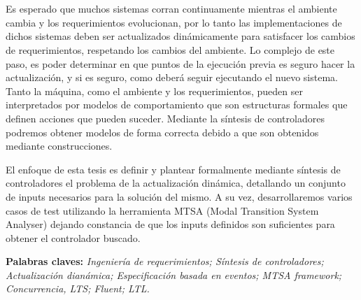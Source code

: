 \chapter*{\runtitulo}

\noindent Es esperado que muchos sistemas corran continuamente mientras el ambiente cambia y los
requerimientos evolucionan, por lo tanto las implementaciones de dichos sistemas deben ser
actualizados dinámicamente para satisfacer los cambios de requerimientos, respetando los cambios
del ambiente. Lo complejo de este paso, es poder determinar en que puntos de la ejecución previa
es seguro hacer la actualización, y si es seguro, como deberá seguir ejecutando el nuevo sistema.
Tanto la máquina, como el ambiente y los requerimientos, pueden ser interpretados por modelos de 
comportamiento que son estructuras formales que definen acciones que pueden suceder. Mediante la
síntesis de controladores podremos obtener modelos de forma correcta debido a que son obtenidos 
mediante construcciones. 

\noindent El enfoque de esta tesis es definir y plantear formalmente mediante síntesis de
controladores el problema de la actualización dinámica, detallando un conjunto de inputs 
necesarios para la solución del mismo. A su vez, desarrollaremos varios casos de test utilizando la
herramienta MTSA (Modal Transition System Analyser) dejando constancia de que los inputs definidos 
son suficientes para obtener el controlador buscado.

 
\bigskip

\noindent\textbf{Palabras claves:} \textit{Ingeniería de requerimientos; Síntesis de controladores;
Actualización dianámica; Especificación basada en eventos; MTSA framework; Concurrencia, LTS;
Fluent; LTL.}
